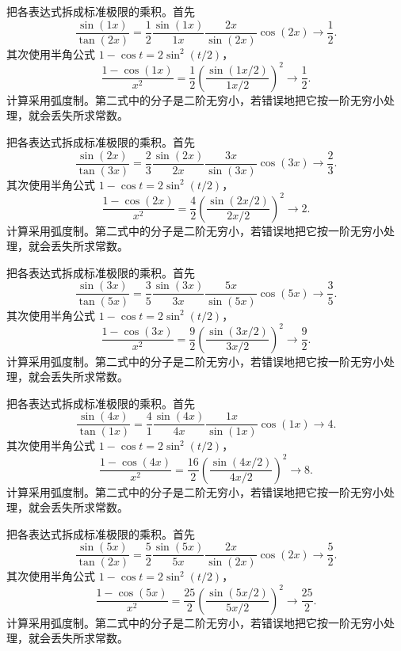 \documentclass[UTF8,12pt,a4paper,fontset=fandol]{ctexart}
\begin{document}
\begin{solve}\label{ans:c3q8}
把各表达式拆成标准极限的乘积。首先
\[
\frac{\sin(1x)}{\tan(2x)}=\frac{1}{2}\frac{\sin(1x)}{1x}\frac{2x}{\sin(2x)}\cos(2x)\longrightarrow \frac{1}{2}.
\]
其次使用半角公式 $1-\cos t=2\sin^2(t/2)$，
\[
\frac{1-\cos(1x)}{x^2}=\frac{1}2\left(\frac{\sin(1x/2)}{1x/2}\right)^2\longrightarrow \frac{1}{2}.
\]
计算采用弧度制。第二式中的分子是二阶无穷小，若错误地把它按一阶无穷小处理，就会丢失所求常数。
\end{solve}

\begin{solve}\label{ans:c3q9}
把各表达式拆成标准极限的乘积。首先
\[
\frac{\sin(2x)}{\tan(3x)}=\frac{2}{3}\frac{\sin(2x)}{2x}\frac{3x}{\sin(3x)}\cos(3x)\longrightarrow \frac{2}{3}.
\]
其次使用半角公式 $1-\cos t=2\sin^2(t/2)$，
\[
\frac{1-\cos(2x)}{x^2}=\frac{4}2\left(\frac{\sin(2x/2)}{2x/2}\right)^2\longrightarrow 2.
\]
计算采用弧度制。第二式中的分子是二阶无穷小，若错误地把它按一阶无穷小处理，就会丢失所求常数。
\end{solve}

\begin{solve}\label{ans:c3q10}
把各表达式拆成标准极限的乘积。首先
\[
\frac{\sin(3x)}{\tan(5x)}=\frac{3}{5}\frac{\sin(3x)}{3x}\frac{5x}{\sin(5x)}\cos(5x)\longrightarrow \frac{3}{5}.
\]
其次使用半角公式 $1-\cos t=2\sin^2(t/2)$，
\[
\frac{1-\cos(3x)}{x^2}=\frac{9}2\left(\frac{\sin(3x/2)}{3x/2}\right)^2\longrightarrow \frac{9}{2}.
\]
计算采用弧度制。第二式中的分子是二阶无穷小，若错误地把它按一阶无穷小处理，就会丢失所求常数。
\end{solve}

\begin{solve}\label{ans:c3q11}
把各表达式拆成标准极限的乘积。首先
\[
\frac{\sin(4x)}{\tan(1x)}=\frac{4}{1}\frac{\sin(4x)}{4x}\frac{1x}{\sin(1x)}\cos(1x)\longrightarrow 4.
\]
其次使用半角公式 $1-\cos t=2\sin^2(t/2)$，
\[
\frac{1-\cos(4x)}{x^2}=\frac{16}2\left(\frac{\sin(4x/2)}{4x/2}\right)^2\longrightarrow 8.
\]
计算采用弧度制。第二式中的分子是二阶无穷小，若错误地把它按一阶无穷小处理，就会丢失所求常数。
\end{solve}

\begin{solve}\label{ans:c3q12}
把各表达式拆成标准极限的乘积。首先
\[
\frac{\sin(5x)}{\tan(2x)}=\frac{5}{2}\frac{\sin(5x)}{5x}\frac{2x}{\sin(2x)}\cos(2x)\longrightarrow \frac{5}{2}.
\]
其次使用半角公式 $1-\cos t=2\sin^2(t/2)$，
\[
\frac{1-\cos(5x)}{x^2}=\frac{25}2\left(\frac{\sin(5x/2)}{5x/2}\right)^2\longrightarrow \frac{25}{2}.
\]
计算采用弧度制。第二式中的分子是二阶无穷小，若错误地把它按一阶无穷小处理，就会丢失所求常数。
\end{solve}
\end{document}

